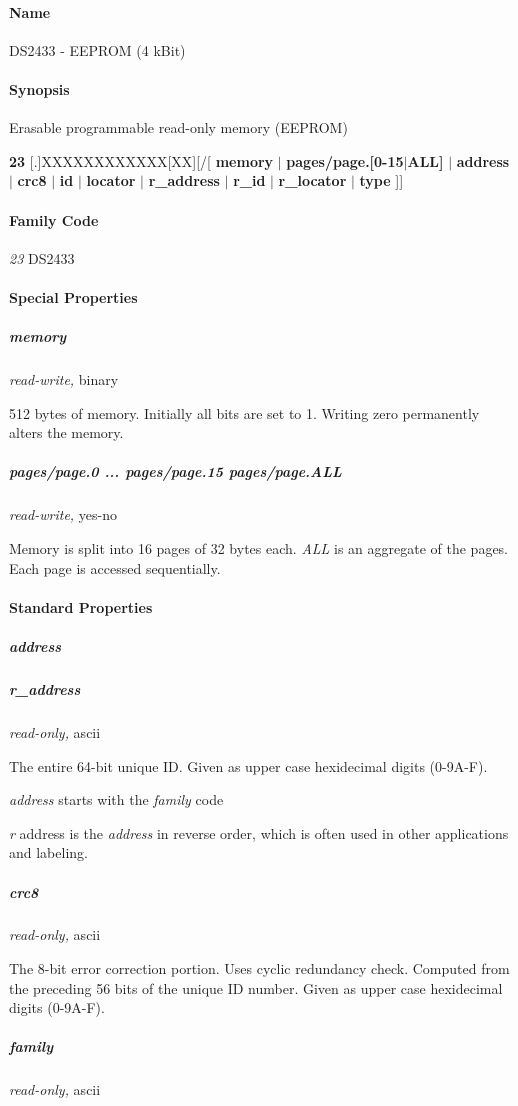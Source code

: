 \paragraph*{Name}
DS2433 - EEPROM (4 kBit) 
\paragraph*{Synopsis}
Erasable programmable read-only
memory (EEPROM) 

\textbf{23} [.]XXXXXXXXXXXX[XX][/[ \textbf{memory} $|$ \textbf{pages/page.[0-15$|$ALL]} $|$  
        \textbf{address} $|$ \textbf{crc8} $|$ \textbf{id} $|$ \textbf{locator} $|$ \textbf{r\_address} $|$ \textbf{r\_id} $|$ \textbf{r\_locator} $|$ \textbf{type}  ]]

\paragraph*{Family Code}


\textit{23} DS2433 
\paragraph*{Special Properties}

\subparagraph*{memory}\textit{read-write,} binary 

512 bytes of memory. Initially all bits are set to 1. Writing zero permanently
alters the memory. 
\subparagraph*{pages/page.0 ... pages/page.15 pages/page.ALL}\textit{read-write,} yes-no


Memory is split into 16 pages of 32 bytes each. \textit{ALL} is an aggregate of the
pages. Each page is accessed sequentially. 
\paragraph*{Standard Properties}
          
\subparagraph*{address}
\subparagraph*{r\_address}\textit{read-only,}
ascii 

The entire 64-bit unique ID. Given as upper case hexidecimal digits (0-9A-F).


\textit{address} starts with the \textit{family} code 

\textit{r} address is the \textit{address} in reverse order, which is often used in other
applications and labeling. 
\subparagraph*{crc8}\textit{read-only,} ascii 

The 8-bit error correction portion. Uses cyclic redundancy check. Computed
from the preceding 56 bits of the unique ID number. Given as upper case
hexidecimal digits (0-9A-F). 
\subparagraph*{family}\textit{read-only,} ascii 

